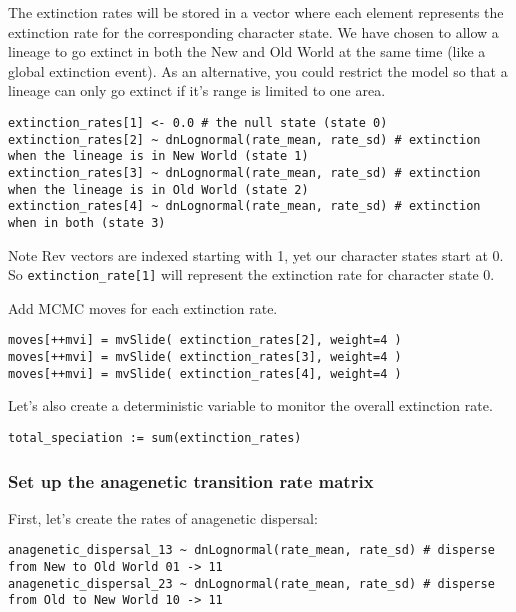 The extinction rates will be stored in a vector where each element represents
the extinction rate for the corresponding character state. 
We have chosen to allow a lineage to go extinct in both the New and Old World 
at the same time (like a global extinction event). As an alternative, you could 
restrict the model so that a lineage can only go extinct if it's range is limited 
to one area.
{\tt \begin{snugshade*}
\begin{lstlisting}
extinction_rates[1] <- 0.0 # the null state (state 0)
extinction_rates[2] ~ dnLognormal(rate_mean, rate_sd) # extinction when the lineage is in New World (state 1)
extinction_rates[3] ~ dnLognormal(rate_mean, rate_sd) # extinction when the lineage is in Old World (state 2)
extinction_rates[4] ~ dnLognormal(rate_mean, rate_sd) # extinction when in both (state 3)
\end{lstlisting}
\end{snugshade*}}
Note Rev vectors are indexed starting with 1, yet our character states start
at 0. So \texttt{extinction\_rate[1]} will represent the extinction rate for character
state 0.

Add MCMC moves for each extinction rate.
{\tt \begin{snugshade*}
\begin{lstlisting}
moves[++mvi] = mvSlide( extinction_rates[2], weight=4 )
moves[++mvi] = mvSlide( extinction_rates[3], weight=4 )
moves[++mvi] = mvSlide( extinction_rates[4], weight=4 )
\end{lstlisting}
\end{snugshade*}}

Let's also create a deterministic variable to monitor the overall extinction rate.
{\tt \begin{snugshade*}
\begin{lstlisting}
total_speciation := sum(extinction_rates)
\end{lstlisting}
\end{snugshade*}}

\subsubsection{Set up the anagenetic transition rate matrix}

First, let's create the rates of anagenetic dispersal:
{\tt \begin{snugshade*}
\begin{lstlisting}
anagenetic_dispersal_13 ~ dnLognormal(rate_mean, rate_sd) # disperse from New to Old World 01 -> 11
anagenetic_dispersal_23 ~ dnLognormal(rate_mean, rate_sd) # disperse from Old to New World 10 -> 11
\end{lstlisting}
\end{snugshade*}}


